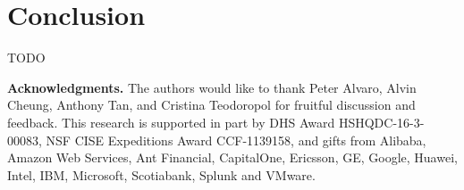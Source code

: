 \section{Conclusion}
TODO

\textbf{Acknowledgments.}
The authors would like to thank Peter Alvaro, Alvin Cheung, Anthony Tan,
and Cristina Teodoropol for fruitful discussion and feedback.
%
This research is supported in part by DHS Award HSHQDC-16-3-00083, NSF CISE
Expeditions Award CCF-1139158, and gifts from Alibaba, Amazon Web Services, Ant
Financial, CapitalOne, Ericsson, GE, Google, Huawei, Intel, IBM, Microsoft,
Scotiabank, Splunk and VMware.
